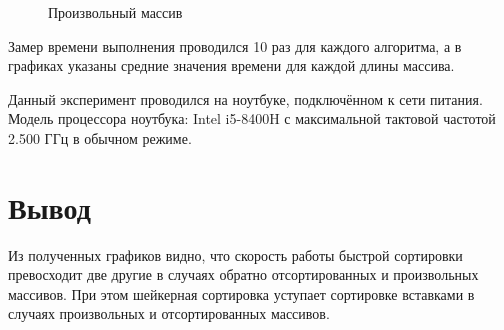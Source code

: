 \begin{figure}[H]
    \centering
    \caption{Произвольный массив}
    \label{img:pltrandom}
\end{figure}

Замер времени выполнения проводился 10 раз для каждого алгоритма, а в графиках указаны средние значения времени для каждой длины массива.

Данный эксперимент проводился на ноутбуке, подключённом к сети питания. Модель процессора ноутбука: Intel i5-8400H с максимальной тактовой частотой 2.500 ГГц в обычном режиме.

\section{Вывод}
Из полученных графиков видно, что скорость работы быстрой сортировки превосходит две другие в случаях обратно отсортированных и произвольных массивов. При этом шейкерная сортировка уступает сортировке вставками в случаях произвольных и отсортированных массивов.

